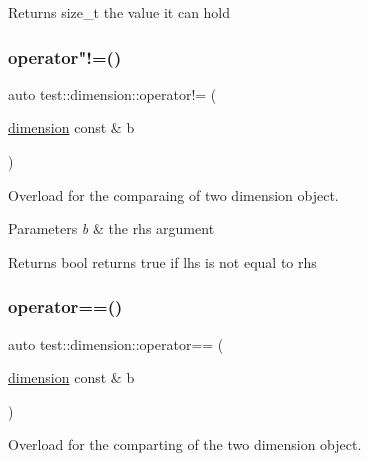 \begin{DoxyReturn}{Returns}
size\+\_\+t the value it can hold 
\end{DoxyReturn}
\mbox{\label{structtest_1_1dimension_a4ccff7455f749c0d0faf8f33298e4593}} 
\subsubsection{\texorpdfstring{operator"!=()}{operator!=()}}
{\footnotesize\ttfamily auto test\+::dimension\+::operator!= (\begin{DoxyParamCaption}\item[{\mbox{\hyperlink{structtest_1_1dimension}{dimension}} const \&}]{b }\end{DoxyParamCaption})\hspace{0.3cm}{\ttfamily [inline]}}



Overload for the comparaing of two dimension object. 


\begin{DoxyParams}{Parameters}
{\em b} & the rhs argument \\
\hline
\end{DoxyParams}
\begin{DoxyReturn}{Returns}
bool returns true if lhs is not equal to rhs 
\end{DoxyReturn}
\mbox{\label{structtest_1_1dimension_a4e3df1f6a81a202a23ed874fa8facba7}} 
\subsubsection{\texorpdfstring{operator==()}{operator==()}}
{\footnotesize\ttfamily auto test\+::dimension\+::operator== (\begin{DoxyParamCaption}\item[{\mbox{\hyperlink{structtest_1_1dimension}{dimension}} const \&}]{b }\end{DoxyParamCaption})\hspace{0.3cm}{\ttfamily [inline]}}



Overload for the comparting of the two dimension object. 


